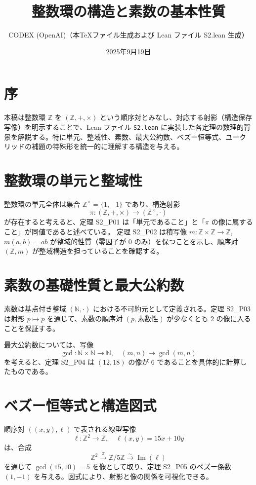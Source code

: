 \documentclass{ltjsarticle}
\title{整数環の構造と素数の基本性質}
\author{CODEX (OpenAI)（本TeXファイル生成および Lean ファイル S2.lean 生成）}
\date{2025年9月19日}
\begin{document}
\maketitle

\section*{序}
本稿は整数環 $\mathbb{Z}$ を $(\mathbb{Z}, +, \times)$ という順序対とみなし、対応する射影（構造保存写像）を明示することで、Lean ファイル \texttt{S2.lean} に実装した各定理の数理的背景を解説する。特に単元、整域性、素数、最大公約数、ベズー恒等式、ユークリッドの補題の特殊形を統一的に理解する構造を与える。

\section{整数環の単元と整域性}
整数環の単元全体は集合 $\mathbb{Z}^\times = \{1, -1\}$ であり、構造射影
\[
\pi : (\mathbb{Z}, +, \times) \to (\mathbb{Z}^\times, \cdot)
\]
が存在すると考えると、定理 S2\_P01 は「単元であること」と「$\pi$ の像に属すること」が同値であると述べている。
定理 S2\_P02 は積写像 $m : \mathbb{Z} \times \mathbb{Z} \to \mathbb{Z}$, $m(a,b) = ab$ が整域的性質（零因子が 0 のみ）を保つことを示し、順序対 $(\mathbb{Z}, m)$ が整域構造を担っていることを確認する。

\section{素数の基礎性質と最大公約数}
素数は基点付き整域 $(\mathbb{N}, \cdot)$ における不可約元として定義される。定理 S2\_P03 は射影 $p \mapsto p$ を通じて、素数の順序対 $(p, \text{素数性})$ が少なくとも $2$ の像に入ることを保証する。

最大公約数については、写像
\[
\operatorname{gcd} : \mathbb{N} \times \mathbb{N} \to \mathbb{N}, \quad (m,n) \mapsto \gcd(m,n)
\]
を考えると、定理 S2\_P04 は $(12,18)$ の像が $6$ であることを具体的に計算したものである。

\section{ベズー恒等式と構造図式}
順序対 $((x,y),\ell)$ で表される線型写像
\[
\ell : \mathbb{Z}^2 \to \mathbb{Z}, \quad \ell(x,y) = 15x + 10y
\]
は、合成
\[
\mathbb{Z}^2 \xrightarrow{\pi} \mathbb{Z}/5\mathbb{Z} \xrightarrow{\sim} \operatorname{Im}(\ell)
\]
を通じて $\gcd(15,10) = 5$ を像として取り、定理 S2\_P05 のベズー係数 $(1,-1)$ を与える。図式により、射影と像の関係を可視化できる。
\end{document}
